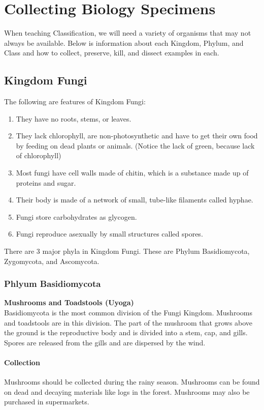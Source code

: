 \chapter{Collecting Biology Specimens}

When teaching Classification, we will need a variety of organisms that may not always be available. Below is information about each Kingdom, Phylum, and Class and how to collect, preserve, kill, and dissect examples in each.

\section{Kingdom Fungi}
The following are features of Kingdom Fungi:
\begin{enumerate}
\item{They have no roots, stems, or leaves.}
\item{They lack chlorophyll, are non-photosynthetic and have to get their own food by feeding on dead plants or animals. (Notice the lack of green, because lack of chlorophyll)}
\item{Most fungi have cell walls made of chitin, which is a substance made up of proteins and sugar.}
\item{Their body is made of a network of small, tube-like filaments called hyphae.}
\item{Fungi store carbohydrates as glycogen.}
\item{Fungi reproduce asexually by small structures called spores.} 
\end{enumerate}

There are 3 major phyla in Kingdom Fungi. These are Phylum Basidiomycota, Zygomycota, and Ascomycota.
\subsection{Phlyum Basidiomycota}

\textbf{Mushrooms and Toadstools (Uyoga)}\\
Basidiomycota is the most common division of the Fungi Kingdom. Mushrooms and toadstools are in this division. The part of the mushroom that grows above the ground is the reproductive body and is divided into a stem, cap, and gills. Spores are released from the gills and are dispersed by the wind.

\subsubsection{Collection}
Mushrooms should be collected during the rainy season. Mushrooms can be found on dead and decaying materials like logs in the forest. Mushrooms may also be purchased in supermarkets.


